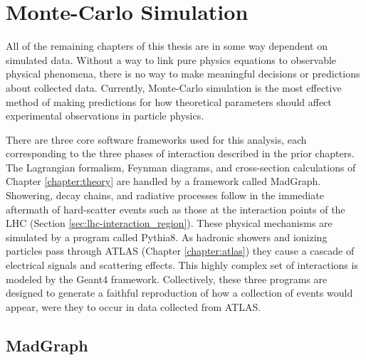 \FloatBarrier
\section{Monte-Carlo Simulation} \label{sec:mcsim}
    
    All of the remaining chapters of this thesis are in some way dependent on simulated data.
    Without a way to link pure physics equations to observable physical phenomena,
        there is no way to make meaningful decisions or predictions about collected data.
    Currently, Monte-Carlo simulation is the most effective method of making predictions
        for how theoretical parameters should affect experimental observations in particle physics.

    There are three core software frameworks used for this analysis,
        each corresponding to the three phases of interaction described in the prior chapters.
    The Lagrangian formalism, Feynman diagrams, and cross-section calculations of Chapter \ref{chapter:theory}
        are handled by a framework called MadGraph.
    Showering, decay chains, and radiative processes follow in the immediate aftermath of
        hard-scatter events such as those at the interaction points of the LHC (Section \ref{sec:lhc-interaction_region}).
    These physical mechanisms are simulated by a program called Pythia8.
    As hadronic showers and ionizing particles pass through ATLAS (Chapter \ref{chapter:atlas})
        they cause a cascade of electrical signals and scattering effects.
    This highly complex set of interactions is modeled by the Geant4 framework.
    Collectively, these three programs are designed to
        generate a faithful reproduction of how a collection of \vbfhhproc events would appear,
        were they to occur in data collected from ATLAS.


    \subsection{MadGraph}

